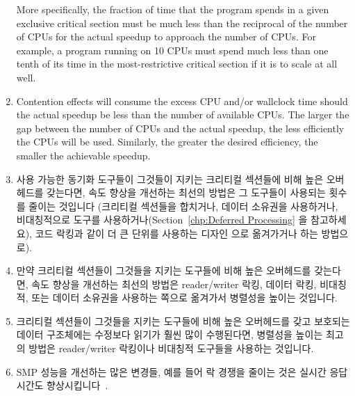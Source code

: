 \begin{enumerate}
	More specifically, the fraction of time that the program spends in
	a given exclusive critical section must be much less than
	the reciprocal of the number of CPUs for the
	actual speedup to approach the number of CPUs.
	For example, a program running on 10 CPUs must spend
	much less than one tenth of its time in the most-restrictive
	critical section if it is to scale at all well.
\item	Contention effects will consume the excess CPU and/or
	wallclock time should the actual speedup be less than
	the number of available CPUs.  The
	larger the gap between the number of CPUs
	and the actual speedup, the less efficiently the
	CPUs will be used.
	Similarly, the greater the desired efficiency, the smaller
	the achievable speedup.
\fi
\item	사용 가능한 동기화 도구들이 그것들이 지키는 크리티컬 섹션들에 비해 높은
	오버헤드를 갖는다면, 속도 향상을 개선하는 최선의 방법은 그 도구들이
	사용되는 횟수를 줄이는 것입니다 (크리티컬 섹션들을 합치거나, 데이터
	소유권을 사용하거나, 비대칭적으로 도구를
	사용하거나(Section~\ref{chp:Deferred Processing} 을 참고하세요), 코드
	락킹과 같이 더 큰 단위를 사용하는 디자인 으로 옮겨가거나 하는
	방법으로).
\item	만약 크리티컬 섹션들이 그것들을 지키는 도구들에 비해 높은 오버헤드를
	갖는다면, 속도 향상을 개선하는 최선의 방법은 reader/writer 락킹, 데이터
	락킹, 비대칭적, 또는 데이터 소유권을 사용하는 쪽으로 옮겨가서 병렬성을
	높이는 것입니다.
\item	크리티컬 섹션들이 그것들을 지키는 도구들에 비해 높은 오버헤드를 갖고
	보호되는 데이터 구조체에는 수정보다 읽기가 훨씬 많이 수행된다면,
	병렬성을 높이는 최고의 방법은 reader/writer 락킹이나 비대칭적 도구들을
	사용하는 것입니다.
\item	SMP 성능을 개선하는 많은 변경들, 예를 들어 락 경쟁을 줄이는 것은 실시간
	응답시간도 향상시킵니다~\cite{PaulMcKenney2005h}.
\iffalse

\item	If the available synchronization primitives have
	high overhead compared to the critical sections
	that they guard, the best way to improve speedup
	is to reduce the number of times that the primitives
	are invoked (perhaps by batching critical sections,
	using data ownership, using asymmetric primitives
	(see Section~\ref{chp:Deferred Processing}),
	or by moving toward a more coarse-grained design
	such as code locking).
\item	If the critical sections have high overhead compared
	to the primitives guarding them, the best way
	to improve speedup is to increase parallelism
	by moving to reader/writer locking, data locking, asymmetric,
	or data ownership.
\item	If the critical sections have high overhead compared
	to the primitives guarding them and the data structure
	being guarded is read much more often than modified,
	the best way to increase parallelism is to move
	to reader/writer locking or asymmetric primitives.
\item	Many changes that improve SMP performance, for example,
	reducing lock contention, also improve real-time
	latencies~\cite{PaulMcKenney2005h}.
\fi
\end{enumerate}

